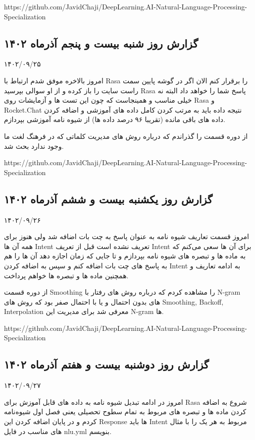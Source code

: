 https://github.com/JavidChaji/DeepLearning.AI-Natural-Language-Processing-Specialization


\subsection{گزارش روز شنبه بیست و پنجم آذر‌ماه ۱۴۰۲}

۱۴۰۲/۰۹/۲۵

امروز بالاخره موفق شدم ارتباط  با Rasa را برقرار کنم الان اگر در گوشه پایین سمت راست سایت  را باز کرده و از او سوالی بپرسید Rasa پاسخ شما را خواهد داد البته نه خیلی مناسب و همینجاست که چون این تست ها و آزمایشات روی Rasa و Rocket.Chat نتیجه داده باید به مرتب کردن کامل داده های آموزشی و اضافه کردن داده های باقی مانده (تقریبا ۹۶ درصد داده ها)
از شیوه نامه آموزشی بپردازم.

از دوره  قسمت   را گذراندم که درباره روش های مدیریت کلماتی که در فرهنگ لغت ما وجود ندارد بحث شد.

https://github.com/JavidChaji/DeepLearning.AI-Natural-Language-Processing-Specialization


\subsection{گزارش روز یکشنبه بیست و ششم آذر‌ماه ۱۴۰۲}

۱۴۰۲/۰۹/۲۶

امروز قسمت تعاریف شیوه نامه به عنوان پاسخ به چت بات اضافه شد ولی هنوز برای همه آن ها Intent تعریف نشده است قبل از تعریف Intent برای آن ها سعی می‌کنم که به ماده ها و تبصره های شیوه نامه بپردازم و تا جایی که زمان اجازه دهد آن ها را هم به پاسخ های چت بات اضافه کنم و سپس به اضافه کردن Intent به ادامه تعاریف و همچنین ماده ها و تبصره ها خواهم پرداخت.

از دوره  قسمت Smoothing را مشاهده کردم که درباره روش های رفتار با N-gram های بدون احتمال و یا با احتمال صفر بود که روش های Smoothing, Backoff, Interpolation معرفی شد برای مدیریت این N-gram ها.

https://github.com/JavidChaji/DeepLearning.AI-Natural-Language-Processing-Specialization


\subsection{گزارش روز دوشنبه بیست و هفتم آذر‌ماه ۱۴۰۲}

۱۴۰۲/۰۹/۲۷

امروز در ادامه تبدیل شیوه نامه به داده های قابل آموزش برای Rasa شروع به اضافه کردن ماده ها و تبصره های مربوط به تمام سطوح تحصیلی یعنی فصل اول شیوه‌نامه کردم و در پایان اضافه کردن این Response ها باید Intent مربوط به هر یک را با مثال های مناسب در فایل nlu.yml بنویسم.

